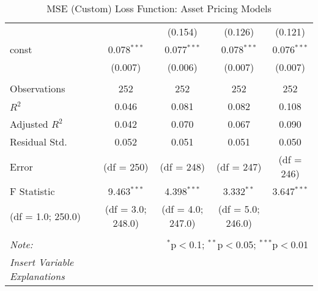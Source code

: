 \begin{table}[H]
\begin{tabular}{@{\extracolsep{5pt}}lcccc}
                      &                                                                                  & (0.154)           & (0.126)           & (0.121)        \\
    const             & 0.078$^{***}$                                                                    & 0.077$^{***}$     & 0.078$^{***}$     & 0.076$^{***}$  \\
                      & (0.007)                                                                          & (0.006)           & (0.007)           & (0.007)        \\
    \hline                                                                                                                                                        \\[-1.8ex]
    Observations      & 252                                                                              & 252               & 252               & 252            \\
    $R^2$             & 0.046                                                                            & 0.081             & 0.082             & 0.108          \\
    Adjusted $R^2$    & 0.042                                                                            & 0.070             & 0.067             & 0.090          \\
    Residual Std.     & 0.052                                                                            & 0.051             & 0.051             & 0.050          \\
    Error             & (df = 250)                                                                       & (df = 248)        & (df = 247)        & (df = 246)     \\
    F Statistic       & 9.463$^{***}$                                                                    & 4.398$^{***}$     & 3.332$^{**}$      & 3.647$^{***}$  \\
    (df = 1.0; 250.0) & (df = 3.0; 248.0)                                                                & (df = 4.0; 247.0) & (df = 5.0; 246.0)                  \\
    \hline
    \hline                                                                                                                                                        \\[-1.8ex]
    \textit{Note:}    & \multicolumn{4}{r}{$^{*}$p$<$0.1; $^{**}$p$<$0.05; $^{***}$p$<$0.01}                                                                      \\
    \textit{Insert Variable Explanations}                                                                                                                         \\
  \end{tabular}
  \caption{MSE (Custom) Loss Function: Asset Pricing Models}
  \label{mse-apm}
\end{table}




